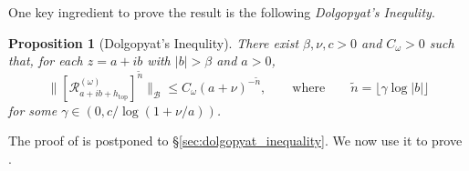 \documentclass[11pt,letterpaper]{amsart}
\newcommand \cR {{\mathcal R}}
\newcommand \cB {{\mathscr B}}
\DeclareMathOperator{\topp}{top}
\newtheorem {proposition}[theorem]{Proposition}
\theoremstyle{definition}
\begin{document}
One key ingredient to prove the result is the following \emph{Dolgopyat's Inequlity}. 

\begin{proposition}[Dolgopyat's Inequlity]\label{prop:dolgopyat_inequality}
	There exist $\beta,\nu, c >0$ and $C_\omega >0$ such that, for each $z=a+ib$ with  $|b|>\beta$ and $a>0$, 
	\begin{equation}\label{eq:dolg}
		\|[\cR^{(\omega)}_{a+ib+h_{\topp}}]^{\tilde n} \|_{\cB} \le C_\omega (a+\nu)^{-\tilde n}, \qquad \text {where} \qquad \tilde n= \lfloor \gamma \log |b| \rfloor
	\end{equation}
	for some $\gamma \in (0, c/\log(1+\nu/a))$.
\end{proposition}

The proof of  is postponed to \S\ref{sec:dolgopyat_inequality}. We now use it to prove .
\end{document}
